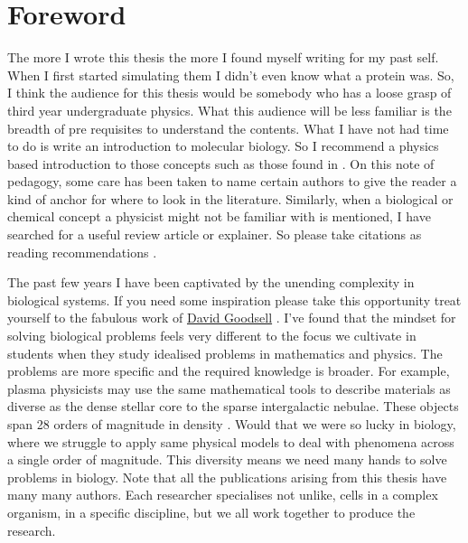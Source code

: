 \setcounter{page}{1}
\chapter*{Foreword}
\label{chap:foreword}


The more I wrote this thesis the more I found myself writing for my past self. When I first started simulating them I didn't even know what a protein was. So, I think the audience for this thesis would be somebody who has a loose grasp of third year undergraduate physics. What this audience will be less familiar is the breadth of pre requisites to understand the contents. What I have not had time to do is write an introduction to molecular biology. So I recommend a physics based introduction to those concepts such as those found in \cite{phillips2012}. On this note of pedagogy, some care has been  taken to name certain authors to give the reader a kind of anchor for where to look in the literature. Similarly, when a biological or chemical concept a physicist might not be familiar with is mentioned, I have searched for a useful review article or explainer. So please take citations as reading recommendations \cite{dawkins1989, hofstadter1999}.

The past few years I have been captivated by the unending complexity in biological systems. If you need some inspiration please take this opportunity treat yourself to the fabulous work of \href {https://pdb101.rcsb.org/sci-art/goodsell-gallery}{David Goodsell} \cite{goodsell2009, goodsell2018, goodsell2020}. I've found that the mindset for solving biological problems feels very different to the focus we cultivate in students when they study idealised problems in mathematics and physics. The problems are more specific and the required knowledge is broader. For example, plasma physicists may use the same mathematical tools to describe materials as diverse as the dense stellar core to the sparse intergalactic nebulae. These objects span 28 orders of magnitude in density \cite{chen2018}. Would that we were so lucky in biology, where we struggle to apply same physical models to deal with phenomena across a single order of magnitude. This diversity means we need many hands to solve problems in biology. Note that all the publications arising from this thesis have many many authors. Each researcher specialises not unlike, cells in a complex organism, in a specific discipline, but we all work together to produce the research.

